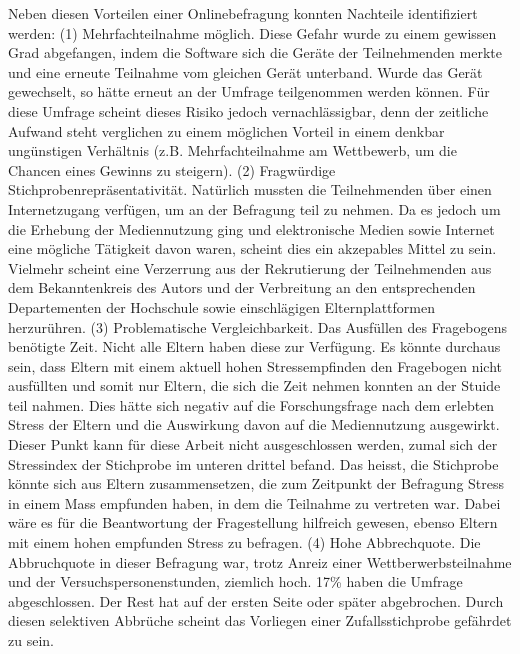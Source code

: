 Neben diesen Vorteilen einer Onlinebefragung konnten Nachteile identifiziert werden\cite{Rey2009}: (1) Mehrfachteilnahme möglich. Diese Gefahr wurde zu einem gewissen Grad abgefangen, indem die Software sich die Geräte der Teilnehmenden merkte und eine erneute Teilnahme vom gleichen Gerät unterband. Wurde das Gerät gewechselt, so hätte erneut an der Umfrage teilgenommen werden können. Für diese Umfrage scheint dieses Risiko jedoch vernachlässigbar, denn der zeitliche Aufwand steht verglichen zu einem möglichen Vorteil in einem denkbar ungünstigen Verhältnis (z.B. Mehrfachteilnahme am Wettbewerb, um die Chancen eines Gewinns zu steigern). (2) Fragwürdige Stichprobenrepräsentativität. Natürlich mussten die Teilnehmenden über einen Internetzugang verfügen, um an der Befragung teil zu nehmen. Da es jedoch um die Erhebung der Mediennutzung ging und elektronische Medien sowie Internet eine mögliche Tätigkeit davon waren, scheint dies ein akzepables Mittel zu sein. Vielmehr scheint eine Verzerrung aus der Rekrutierung der Teilnehmenden aus dem Bekanntenkreis des Autors und der Verbreitung an den entsprechenden Departementen der Hochschule sowie einschlägigen Elternplattformen herzurühren. (3) Problematische Vergleichbarkeit. Das Ausfüllen des Fragebogens benötigte Zeit. Nicht alle Eltern haben diese zur Verfügung. Es könnte durchaus sein, dass Eltern mit einem aktuell hohen Stressempfinden den Fragebogen nicht ausfüllten und somit nur Eltern, die sich die Zeit nehmen konnten an der Stuide teil nahmen. Dies hätte sich negativ auf die Forschungsfrage nach dem erlebten Stress der Eltern und die Auswirkung davon auf die Mediennutzung ausgewirkt. Dieser Punkt kann für diese Arbeit nicht ausgeschlossen werden, zumal sich der Stressindex der Stichprobe im unteren drittel befand. Das heisst, die Stichprobe könnte sich aus Eltern zusammensetzen, die zum Zeitpunkt der Befragung Stress in einem Mass empfunden haben, in dem die Teilnahme zu vertreten war. Dabei wäre es für die Beantwortung der Fragestellung hilfreich gewesen, ebenso Eltern mit einem hohen empfunden Stress zu befragen. (4) Hohe Abbrechquote. Die Abbruchquote in dieser Befragung war, trotz Anreiz einer Wettberwerbsteilnahme und der Versuchspersonenstunden, ziemlich hoch. 17\% haben die Umfrage abgeschlossen. Der Rest hat auf der ersten Seite oder später abgebrochen. Durch diesen selektiven Abbrüche scheint das Vorliegen einer Zufallsstichprobe gefährdet zu sein. 

